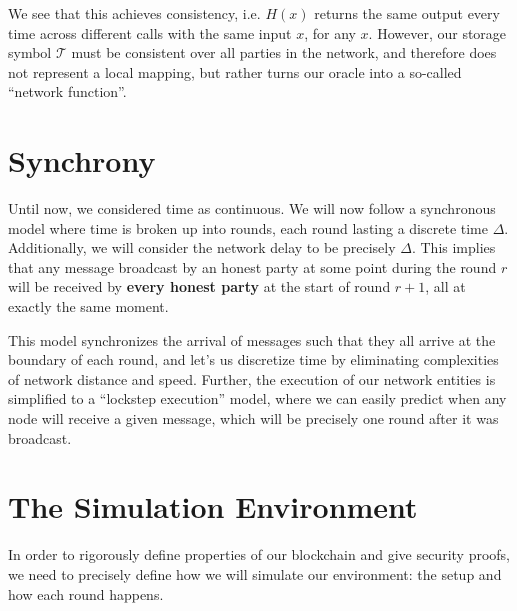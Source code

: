 We see that this achieves consistency, i.e. $H(x)$ returns the same output every time across different calls with the same input $x$, for any $x$. However, our storage symbol $\mathcal{T}$ must be consistent over all parties in the network, and therefore does not represent a local mapping, but rather turns our oracle into a so-called ``network function''.


\section{Synchrony}
Until now, we considered time as continuous. We will now follow a synchronous model where time is broken up into rounds, each round lasting a discrete time $\Delta$. Additionally, we will consider the network delay to be precisely $\Delta$. This implies that any message broadcast by an honest party at some point during the round $r$ will be received by \textbf{every honest party} at the start of round $r+1$, all at exactly the same moment.

This model synchronizes the arrival of messages such that they all arrive at the boundary of each round, and let's us discretize time by eliminating complexities of network distance and speed. Further, the execution of our network entities is simplified to a ``lockstep execution'' model, where we can easily predict when any node will receive a given message, which will be precisely one round after it was broadcast.

\section{The Simulation Environment}
In order to rigorously define properties of our blockchain and give security proofs, we need to precisely define how we will simulate our environment: the setup and how each round happens.

